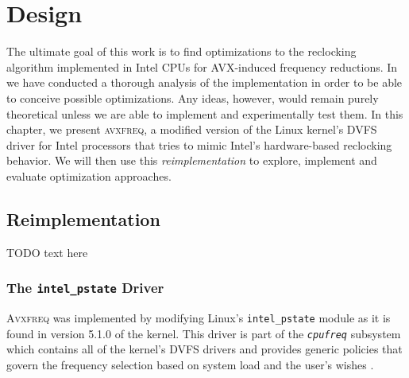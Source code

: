 \chapter{Design}
\label{sec:design}

The ultimate goal of this work is to find optimizations to the reclocking algorithm implemented in Intel \glspl{CPU} for \gls{AVX}-induced frequency reductions. In  we have conducted a thorough analysis of the implementation in order to be able to conceive possible optimizations. Any ideas, however, would remain purely theoretical unless we are able to implement and experimentally test them. In this chapter, we present \textsc{avxfreq}, a modified version of the Linux kernel's \gls{DVFS} driver for Intel processors that tries to mimic Intel's hardware-based reclocking behavior. We will then use this \emph{reimplementation} to explore, implement and evaluate optimization approaches.

\section{Reimplementation}

TODO text here

\subsection{The \texttt{intel\_pstate} Driver}

\textsc{Avxfreq} was implemented by modifying Linux's \texttt{intel\_pstate} module as it is found in version 5.1.0 of the kernel. This driver is part of the \textit{\texttt{cpufreq}} subsystem which contains all of the kernel's \gls{DVFS} drivers and provides generic policies that govern the frequency selection based on system load and the user's wishes \cite{cpufreq}. %


